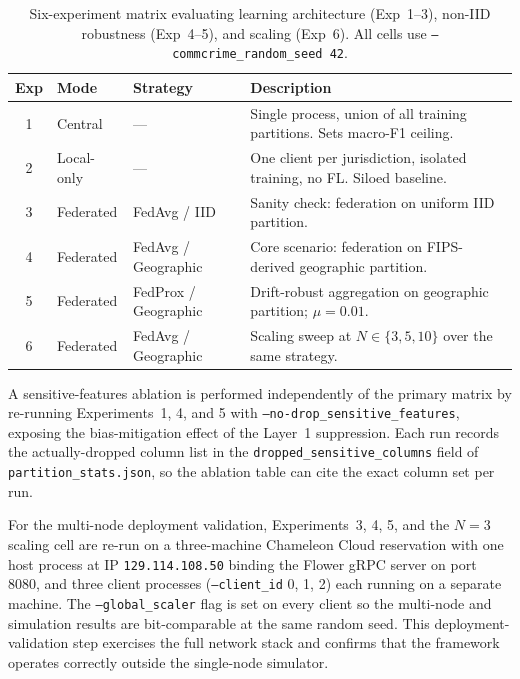 \documentclass[conference]{IEEEtran}
\begin{document}
\begin{table}[!htbp]
\centering
\caption{Six-experiment matrix evaluating learning architecture (Exp~1--3), non-IID robustness (Exp~4--5), and scaling (Exp~6). All cells use \texttt{--commcrime\_random\_seed 42}.}
\label{tab:experiment_matrix}
\small
\setlength{\tabcolsep}{4pt}
\begin{tabularx}{\columnwidth}{c l l X}
\toprule
\textbf{Exp} & \textbf{Mode} & \textbf{Strategy} & \textbf{Description} \\
\midrule
1 & Central     & ---                  & Single process, union of all training partitions. Sets macro-F1 ceiling. \\
2 & Local-only  & ---                  & One client per jurisdiction, isolated training, no FL. Siloed baseline. \\
3 & Federated   & FedAvg / IID         & Sanity check: federation on uniform IID partition. \\
4 & Federated   & FedAvg / Geographic  & Core scenario: federation on FIPS-derived geographic partition. \\
5 & Federated   & FedProx / Geographic & Drift-robust aggregation on geographic partition; $\mu = 0.01$. \\
6 & Federated   & FedAvg / Geographic  & Scaling sweep at $N \in \{3,5,10\}$ over the same strategy. \\
\bottomrule
\end{tabularx}
\end{table}

A sensitive-features ablation is performed independently of the primary matrix by re-running Experiments~1, 4, and 5 with \texttt{--no-drop\_sensitive\_features}, exposing the bias-mitigation effect of the Layer~1 suppression. Each run records the actually-dropped column list in the \texttt{dropped\_sensitive\_columns} field of \texttt{partition\_stats.json}, so the ablation table can cite the exact column set per run.

For the multi-node deployment validation, Experiments~3, 4, 5, and the $N=3$ scaling cell are re-run on a three-machine Chameleon Cloud reservation with one host process at IP \texttt{129.114.108.50} binding the Flower gRPC server on port 8080, and three client processes (\texttt{--client\_id} 0, 1, 2) each running on a separate machine. The \texttt{--global\_scaler} flag is set on every client so the multi-node and simulation results are bit-comparable at the same random seed. This deployment-validation step exercises the full network stack and confirms that the framework operates correctly outside the single-node simulator.
\end{document}
